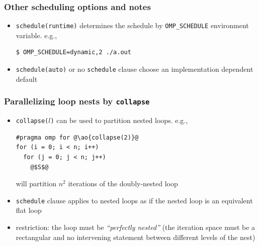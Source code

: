 \documentclass[12pt,dvipdfmx]{beamer}
\newcommand{\ao}[1]{{\color{blue}#1}}
\begin{document}
\begin{frame}[fragile]
\frametitle{Other scheduling options and notes}
\begin{itemize}
\item {\tt schedule(\ao{runtime})} determines the schedule by
  {\tt OMP\_SCHEDULE} environment variable. e.g.,
\begin{lstlisting}
$ OMP_SCHEDULE=dynamic,2 ./a.out
\end{lstlisting} %

\item {\tt schedule(\ao{auto})} or \ao{no {\tt schedule} clause} choose
  an implementation dependent default


\end{itemize}
\end{frame}

\begin{frame}[fragile]
\frametitle{Parallelizing loop nests by \ao{\tt collapse}}
\begin{itemize}
\item \ao{\tt collapse($l$)} can be used to partition nested loops. e.g.,
\begin{lstlisting}
#pragma omp for @\ao{collapse(2)}@
for (i = 0; i < n; i++)
  for (j = 0; j < n; j++)
    @$S$@
\end{lstlisting}
will partition $n^2$ iterations of the doubly-nested loop
\item {\tt schedule} clause applies to nested loops as if 
  the nested loop is an equivalent flat loop
\item restriction: the loop must be \ao{\em ``perfectly nested''}
  (the iteration space must be a rectangular and no intervening
  statement between different levels of the nest)
\end{itemize}
\end{frame}
\end{document}
